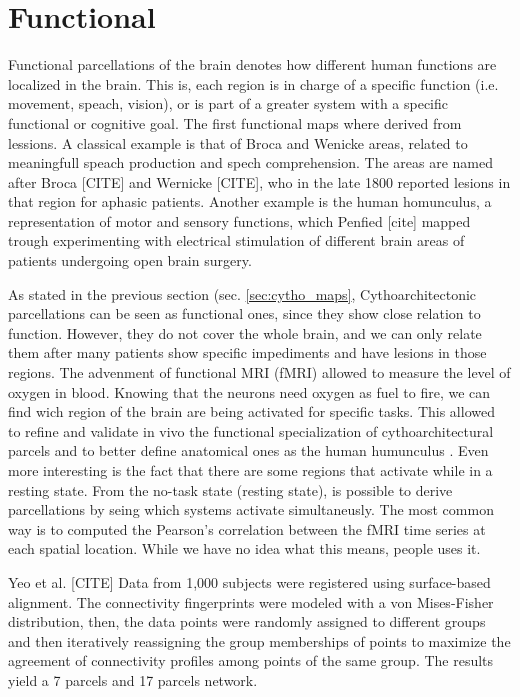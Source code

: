 \section{Functional}
Functional parcellations of the brain denotes how different human functions 
are localized in the brain. This is, each region is in charge of a specific
function (i.e. movement, speach, vision), or is part of a greater system with
a specific functional or cognitive goal. The first functional maps where derived
from lessions. A classical example is that of Broca and Wenicke areas, related
to meaningfull speach production and spech comprehension. The areas are named
after Broca [CITE] and Wernicke [CITE], who in the late 1800 reported lesions in
that region for aphasic patients. Another example is the human homunculus,
a representation of motor and sensory functions, which Penfied [cite] mapped
trough experimenting with electrical stimulation of different brain areas of
patients undergoing open brain surgery.

As stated in the previous section (sec. \ref{sec:cytho_maps}, Cythoarchitectonic
parcellations can be seen as functional ones, since they show close relation 
to function. However, they do not cover the whole brain, and we can only relate
them after many patients show specific impediments and have lesions in those
regions. The advenment of functional MRI (fMRI) allowed to measure the level of
oxygen in blood. Knowing that the neurons need oxygen as fuel to fire, we can
find wich region of the brain are being activated for specific tasks. This
allowed to refine and validate in vivo the functional specialization of 
cythoarchitectural parcels and to better define anatomical ones as the human
humunculus \cite{Lashkari2010, Michel2011}. Even more interesting is the fact
that there are some regions that activate while in a resting state. From the
no-task state (resting state), is possible to derive parcellations by seing
which systems activate simultaneusly. The most common way is to computed the
Pearson's correlation between the fMRI time series at each spatial location.
While we have no idea what this means, people uses it. 

Yeo et al. [CITE] 
Data from 1,000 subjects were registered using surface-based alignment.
The connectivity fingerprints were modeled with a von Mises-Fisher distribution,
then, the data points were randomly assigned to different groups and then
iteratively reassigning the group memberships of points to maximize the
agreement of connectivity profiles among points of the same group. The results
yield a 7 parcels and 17 parcels network.


